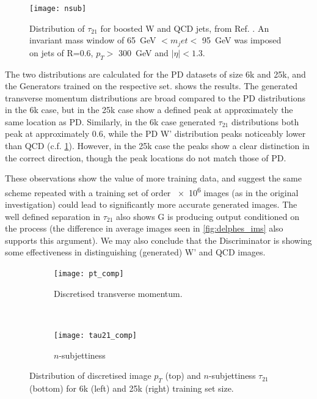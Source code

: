 \documentclass[twocolumn,twoside]{article}
\newcommand{\gev}{\giga\electronvolt}
\begin{document}
\begin{figure}[H]
	\centering
	\texttt{[image: nsub]}
	
	\caption{Distribution of $\tau_{21}$ for boosted W and QCD jets, from Ref. \cite{nsubjettiness}. An invariant mass window of \SI{65}{\gev} $< m_jet <$ \SI{95}{\gev} was imposed on jets of R=0.6, $p_T >$ \SI{300}{\gev} and $|\eta| < 1.3$.}
	\label{fig:nsub}
	
\end{figure}

The two distributions are calculated for the PD datasets of size 6k and 25k, and the Generators trained on the respective set.  shows the results. The generated transverse momentum distributions are broad compared to the PD distributions in the 6k case, but in the 25k case show a defined peak at approximately the same location as PD. Similarly, in the 6k case generated $\tau_{21}$ distributions both peak at approximately 0.6, while the PD W' distribution peaks noticeably lower than QCD (c.f. \cref{fig:nsub}). However, in the 25k case the peaks show a clear distinction in the correct direction, though the peak locations do not match those of PD. 

These observations show the value of more training data, and suggest the same scheme repeated with a training set of order \num{e6} images (as in the original investigation) could lead to significantly more accurate generated images. The well defined separation in $\tau_{21}$ also shows G is producing output conditioned on the process (the difference in average images seen in \cref{fig:delphes_ims} also supports this argument). We may also conclude that the Discriminator is showing some effectiveness in distinguishing (generated) W' and QCD images. 

\begin{figure}[H]
	\centering
	\begin{subfigure}[t]{1.0\linewidth}
	\centering
	\texttt{[image: pt\_comp]}

	\caption{Discretised transverse momentum.}
	\label{fig:pt_comp}
	\end{subfigure}%
	\\
	\begin{subfigure}[t]{1.0\linewidth}
		\centering
		\texttt{[image: tau21\_comp]}
		\caption{$n$-subjettiness}
		\label{fig:tau21_comp}
	\end{subfigure}
	\caption{Distribution of discretised image $p_T$ (top) and $n$-subjettiness $\tau_{21}$ (bottom) for 6k (left) and 25k (right) training set size.}
	\label{fig:phys}
\end{figure}
\end{document}
